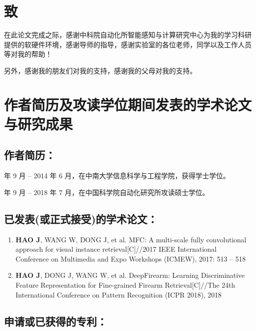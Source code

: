 
\chapter{致}
在此论文完成之际，感谢中科院自动化所智能感知与计算研究中心为我的学习科研提供的软硬件环境，感谢导师的指导，感谢实验室的各位老师，同学以及工作人员等对我的帮助！

另外，感谢我的朋友们对我的支持，感谢我的父母对我的支持。

\chapter{作者简历及攻读学位期间发表的学术论文与研究成果}

\section*{作者简历：}

 年 9 月 -- 2014 年 6 月，在中南大学信息科学与工程学院，获得学士学位。

 年 9 月 -- 2018 年 7 月，在中国科学院自动化研究所攻读硕士学位。

\section*{已发表(或正式接受)的学术论文：}

\begin{enumerate}

	\item \textbf{HAO J}, WANG W, DONG J, et al. MFC: A multi-scale fully convolutional approach for visual instance retrieval[C]//2017 IEEE International Conference on Multimedia and Expo Workshops (ICMEW), 2017: 513 -- 518

	\item \textbf{HAO J}, DONG J, WANG W, et al. DeepFirearm: Learning Discriminative Feature Representation for Fine-grained Firearm Retrieval[C]//The 24th International Conference on Pattern Recognition (ICPR 2018), 2018
\end{enumerate}

\section*{申请或已获得的专利：}

